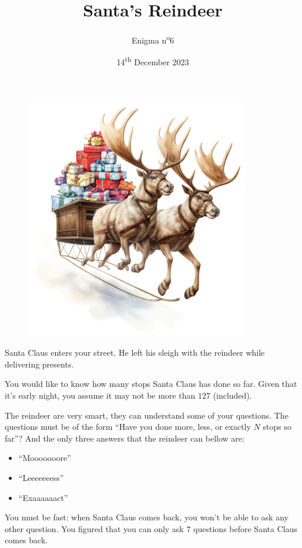 \documentclass[a4paper, top=10mm]{article}
\title{\textbf{\huge{Santa's Reindeer}}}
\author{Enigma n\textsuperscript{o}6}
\date{14\textsuperscript{th} December 2023}
\begin{document}
	\maketitle
	
	\begin{figure}
		\vspace{-2cm}
		\hspace{-0.5cm}
		\includegraphics[height=300pt]{06sleigh_with_presents.png}
	\end{figure}
	
	Santa Claus enters your street.
	He left his sleigh with the reindeer while delivering presents.
	
	You would like to know how many stops Santa Claus has done so far.
	Given that it's early night, you assume it may not be more than $127$ (included).
	
	The reindeer are very smart, they can understand some of your questions.
	The questions must be of the form “Have you done more, less, or exactly $N$ stops so far”?
	And the only three answers that the reindeer can bellow are:
	\begin{itemize}
		\item “Mooooooore”
		\item “Leeeeeeess”
		\item “Exaaaaaact”
	\end{itemize}
	You must be fast: when Santa Claus comes back, you won't be able to ask any other question.
	You figured that you can only ask $7$ questions before Santa Claus comes back.
	
\end{document}
